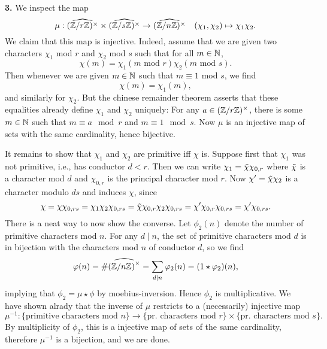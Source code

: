 \documentclass[a4paper,11pt]{article}
\begin{document}
\textbf{3.} 
%
We inspect the map 
\[
    \mu: \widehat{(\mathbb{Z}/r\mathbb{Z})^\times} \times \widehat{(\mathbb{Z}/s\mathbb{Z})^\times} \to
    \widehat{(\mathbb{Z}/n\mathbb{Z})^\times} \quad (\chi_1, \chi_2) \mapsto \chi_1\chi_2.
\]
We claim that this map is injective. Indeed, assume that we are given two
characters $\chi_1$ mod $r$ 
and $\chi_2$ mod $s$ such that for all $m \in \mathbb{N}$, 
\[
    \chi(m) = \chi_1(m \text{ mod $r$}) \chi_2(m \text{ mod $s$}).
\]
Then whenever we are given $m \in \mathbb{N}$ such that $m \equiv 1$ mod $s$, we find 
\[
    \chi(m) = \chi_1(m),
\]
and similarly for $\chi_2$. But the chinese remainder theorem asserts that
these equalities already define $\chi_1$ and $\chi_2$ uniquely: For any $a \in
(\mathbb{Z}/r\mathbb{Z})^\times$, there is some $m \in \mathbb{N}$ such that $m \equiv a \mod r$ and 
$m \equiv 1 \mod s$. Now $\mu$ is an injective map of sets with the same cardinality,
hence bijective.

It remains to show that $\chi_1$ and $\chi_2$ are primitive iff $\chi$ is. Suppose first
that $\chi_1$ was not primitive, i.e., has conductor $d < r$. Then we can write 
$\chi_1 = \Tilde \chi \chi_{0,r}$ where $\Tilde\chi$ is a character mod $d$ and 
$\chi_{0,r}$ is the principal character mod $r$. Now $\chi' = \Tilde \chi \chi_2$ 
is a character modulo $ds$ and induces $\chi$, since
\[
    \chi = \chi \chi_{0,rs} = \chi_1 \chi_2 \chi_{0,rs} = \Tilde \chi \chi_{0,r}\chi_2
    \chi_{0,rs} = \chi' \chi_{0,r} \chi_{0,rs} = \chi' \chi_{0,rs}.
\]
There is a neat way to now show the converse. Let $\phi_2(n)$ denote the number of 
primitive characters mod $n$. For any $d \mid n$, the set of primitive characters
mod $d$ is in bijection with the characters mod $n$ of conductor $d$, so we find
\[
    \varphi(n) = \# \widehat{\left( \mathbb{Z} /n \mathbb{Z} \right)^\times} = \sum_{d \mid n} \varphi_2(n) = (1 \star \varphi_2)(n),
\]
implying that $\phi_2 = \mu \star \phi$ by moebius-inversion. Hence $\phi_2$ is 
multiplicative. We have shown alrady that the inverse of $\mu$ restricts to a
(necessarily) injective map
\[
    \mu^{-1}: \text{\{primitive characters mod $n$\}} \to \text{\{pr.
    characters mod $r$\}} \times \text{\{pr. characters mod $s$\}}. 
\]
By multiplicity of $\phi_2$, this is a injective map of sets of the same cardinality,
therefore $\mu^{-1}$ is a bijection, and we are done. 
\end{document}

